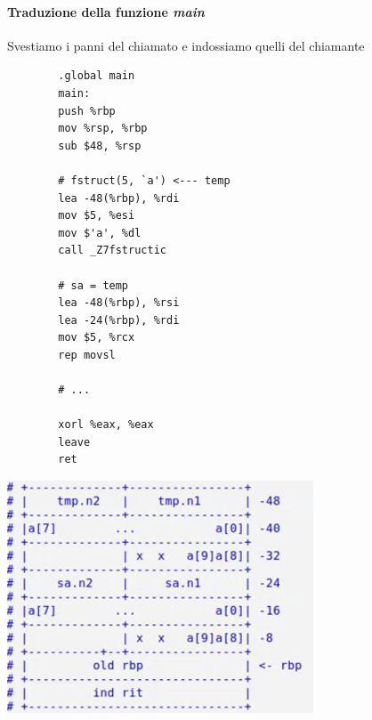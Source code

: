 \paragraph{Traduzione della funzione \emph{main}} Svestiamo i panni del chiamato e indossiamo quelli del chiamante
\begin{multicols}{2}\begin{verbatim}
		.global main
		main:
		push %rbp
		mov %rsp, %rbp
		sub $48, %rsp
		
		# fstruct(5, `a') <--- temp
		lea -48(%rbp), %rdi
		mov $5, %esi
		mov $'a', %dl
		call _Z7fstructic
		
		# sa = temp
		lea -48(%rbp), %rsi
		lea -24(%rbp), %rdi
		mov $5, %rcx
		rep movsl
		
		# ...
		
		xorl %eax, %eax
		leave
		ret
	\end{verbatim}
\end{multicols}
\begin{center}
	\includegraphics{img/44.PNG}
\end{center}  
